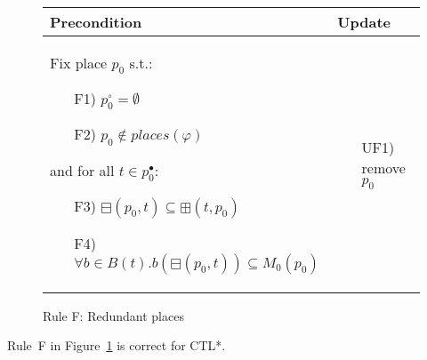 \begin{figure}[h!]
\begin{tikzpicture}
    \end{tikzpicture}
    \vspace{5mm}
    \begin{adjustbox}{center}
        \begin{tabular}{|p{65mm}|p{45mm}|}
            \hline
            Precondition & Update \\ \hline
            Fix place $p_0$ s.t.:
            \begin{itemize}[leftmargin=10mm]
                \item[F1)] $p_0^\circ = \emptyset$
                \item[F2)] $p_0 \not \in places(\varphi)$
            \end{itemize}
            and for all $t\in p_0^\bullet$:
            \begin{itemize}[leftmargin=10mm]
                \item[F3)] $\boxminus(p_0,t)\subseteq \boxplus(t,p_0)$
                \item[F4)] $\forall b\in B(t) . b(\boxminus(p_0,t))\subseteq M_0(p_0)$
            \end{itemize}
            &
            \begin{itemize}[leftmargin=10mm]
                \item[UF1)] remove $p_0$
            \end{itemize} \\ \hline
        \end{tabular}
    \end{adjustbox}
    \caption{Rule F: Redundant places}
    \label{fig:rule_f_cpn}
\end{figure}

\begin{theorem}
    Rule~F in Figure~\ref{fig:rule_f_cpn} is correct for CTL*.
\end{theorem}